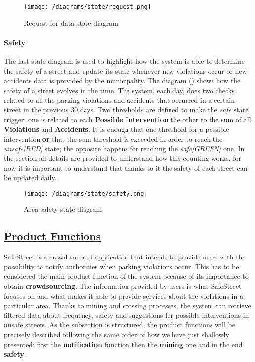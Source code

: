 			\vspace{0.3cm}
			\begin{figure}[h]
				\centering
				\texttt{[image: /diagrams/state/request.png]}
				\caption{\label{fig:requestState}Request for data state diagram}
			\end{figure}
		
		\paragraph{Safety}
			The last state diagram is used to highlight how the system is able to determine the safety of a street and update its state whenever new violations occur or new accidents data is provided by the municipality. The diagram () shows how the safety of a street evolves in the time. The system, each day, does two checks related to all the parking violations and accidents that occurred in a certain street in the previous 30 days. Two thresholds are defined to make the \textit{safe} state trigger: one is related to each \textbf{Possible Intervention} the other to the sum of all \textbf{Violations} and \textbf{Accidents}. It is enough that one threshold for a possible intervention \textbf{or} that the sum threshold is exceeded in order to reach the \textit{unsafe[RED]} state; the opposite happens for reaching the \textit{safe[GREEN]} one. In the section  all details are provided to understand how this counting works, for now it is important to understand that thanks to it the safety of each street can be updated daily.
			
			\vspace{0.3cm}
			\begin{figure}[h]
				\centering
				\texttt{[image: /diagrams/state/safety.png]}
				\caption{\label{fig:safetyState}Area safety state diagram}
			\end{figure}   

\subsection[Product Functions]{\hyperlink{toc}{Product Functions}}
	\label{sec:productFunctions}
	SafeStreet is a crowd-sourced application that intends to provide users with the possibility to notify authorities when parking violations occur. This has to be considered the main product function of the system because of its importance to obtain \textbf{crowdsourcing}. The information provided by users is what SafeStreet focuses on and what makes it able to provide services about the violations in a particular area. Thanks to mining and crossing processes, the system can retrieve filtered data about frequency, safety and suggestions for possible interventions in unsafe streets. As the subsection is structured, the product functions will be precisely described following the same order of how we have just shallowly presented: first the \textbf{notification} function then the \textbf{mining} one and in the end \textbf{safety}. \\
	
